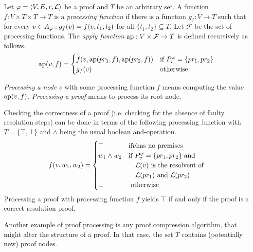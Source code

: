 \begin{definition}
\label{def:proof-processing}

Let $\varphi = \langle V,E,r,\mathcal{L} \rangle$ be a proof and $T$ be an arbitrary set.
A function $f: V \times T \times T \rightarrow T$ is a \emph{processing function} if there is a function $g_f: V \rightarrow T$ such that for every $v \in A_{\varphi}: g_f(v) = f(v,t_1,t_2)$ for all $\{t_1,t_2\} \subseteq T$.
Let $\mathcal{F}$ be the set of processing functions.
The \emph{apply function} $\operatorname{ap}: V \times \mathcal{F} \rightarrow T$ is defined recursively as follows.
$$
\operatorname{ap}(v,f) = 
\begin{cases}
	f(v,\operatorname{ap}(pr_1,f),\operatorname{ap}(pr_2,f)) &\text{if } P_{v}^{\varphi} = \{pr_1,pr_2\} \\
	g_f(v) &\text{otherwise}\\
\end{cases}
$$

\emph{Processing a node} $v$ with some processing function $f$ means computing the value $\operatorname{ap}(v,f)$.
\emph{Processing a proof} means to process its root node.

\end{definition}

\begin{example}

Checking the correctness of a proof (i.e. checking for the absence of faulty resolution steps) can be done in terms of the following processing function with $T = \{\top,\bot\}$ and $\wedge$ being the usual boolean and-operation.
$$
f(v,w_1,w_2) = 
\begin{cases}
	\top & \text{if} v \text{has no premises} \\
	w_1 \wedge w_2 &\text{if } P_{v}^{\varphi} = \{pr_1,pr_2\} \text{ and}\\
								 &\quad \mathcal{L}(v) \text{ is the resolvent of} \\
								 &\quad \mathcal{L}(pr_1) \text{ and } \mathcal{L}(pr_2)\\
	\bot & \text{ otherwise}
\end{cases}
$$
Processing a proof with processing function $f$ yields $\top$ if and only if the proof is a correct resolution proof.
\end{example}

Another example of proof processing is any proof compression algorithm, that might alter the structure of a proof.
In that case, the set $T$ contains (potentially new) proof nodes.